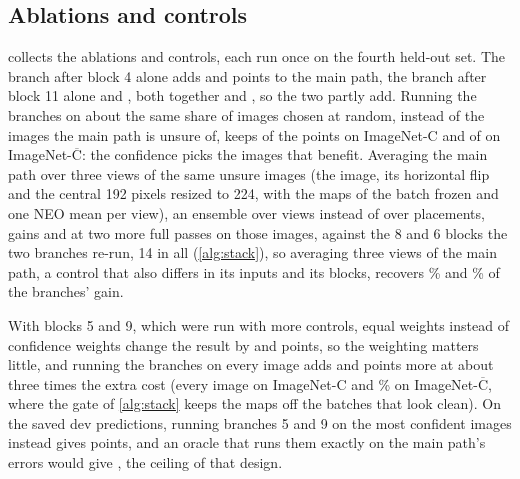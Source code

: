 \documentclass{article}
\newcommand{\neo}{NEO}
\begin{document}
\subsection{Ablations and controls}
\label{app:controls}
 collects the ablations and controls, each run once on the fourth held-out set. The branch after block 4 alone adds  and  points to the main path, the branch after block 11 alone  and , both together  and , so the two partly add. Running the branches on about the same share of images chosen at random, instead of the images the main path is unsure of, keeps  of the  points on ImageNet-C and  of  on ImageNet-$\overline{\text{C}}$: the confidence picks the images that benefit. Averaging the main path over three views of the same unsure images (the image, its horizontal flip and the central 192 pixels resized to 224, with the maps of the batch frozen and one \neo{} mean per view), an ensemble over views instead of over placements, gains  and  at two more full passes on those images, against the 8 and 6 blocks the two branches re-run, 14 in all (\cref{alg:stack}), so averaging three views of the main path, a control that also differs in its inputs and its blocks, recovers \% and \% of the branches' gain.

With blocks 5 and 9, which were run with more controls, equal weights instead of confidence weights change the result by  and  points, so the weighting matters little, and running the branches on every image adds  and  points more at about three times the extra cost (every image on ImageNet-C and \% on ImageNet-$\overline{\text{C}}$, where the gate of \cref{alg:stack} keeps the maps off the batches that look clean). On the saved dev predictions, running branches 5 and 9 on the most confident images instead gives  points, and an oracle that runs them exactly on the main path's errors would give , the ceiling of that design.
\end{document}
